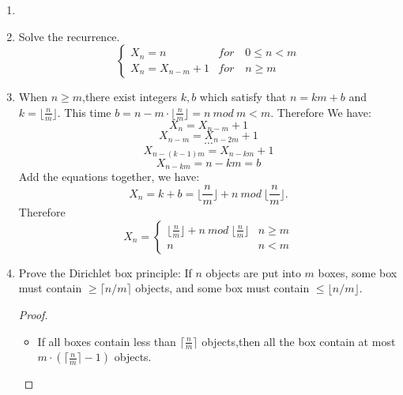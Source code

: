 \documentclass[12pt,a4paper]{article}
\makeatletter
\newtheorem*{solution}{Solution}
\theoremstyle{definition}
\renewenvironment{solution}[1][Solution] {\par\pushQED{\qed}\normalfont\topsep6\p@\@plus6\p@\relax\trivlist\item[\hskip\labelsep\bfseries#1\@addpunct{.}]\ignorespaces}{\popQED\endtrivlist\@endpefalse} \makeatother
\makeatother
\begin{document}
\begin{enumerate}
\begin{solution}
        \end{solution}
    \item
        Solve the recurrence.
        \begin{equation*}
            \begin{cases}
                X_n=n&for\quad 0\le n <m\\
                X_n=X_{n-m}+1&for\quad n\ge m
            \end{cases}
        \end{equation*}
        \begin{solution}
            When $n\ge m$,there exist integers $k,b$ which satisfy that $n=km+b$ and $k=\lfloor \frac{n}{m}\rfloor$.
            This time $b=n-m\cdot \lfloor \frac{n}{m} \rfloor=n\ mod\ m<m$.
            Therefore We have:
            \begin{equation*}
                     X_n=X_{n-m}+1
            \end{equation*}
            \begin{equation*}
                    X_{n-m}=X_{n-2m}+1
            \end{equation*}
            \begin{equation*}
                \cdots
            \end{equation*}
            \begin{equation*}
                X_{n-(k-1)m}=X_{n-km}+1
            \end{equation*}
            \begin{equation*}
               X_{n-km}=n-km=b
            \end{equation*}
            Add the equations together, we have:
            \begin{equation*}
                X_n=k+b=\lfloor \frac{n}{m} \rfloor+n\ mod\ \lfloor \frac{n}{m} \rfloor.
            \end{equation*}
            Therefore 
            \begin{equation*}
                X_n=
                \begin{cases}
                    \lfloor \frac{n}{m} \rfloor+n\ mod\ \lfloor \frac{n}{m} \rfloor&n\ge m\\
                    n&n<m  
                \end{cases}
            \end{equation*}
        \end{solution}
    \item 
        Prove the Dirichlet box principle: If $n$ objects are put into $m$ boxes, some box must contain $\ge \lceil n/m \rceil$ objects, and some box must contain $\le \lfloor n/m \rfloor$.
        \begin{proof}
            \ \\
            \begin{itemize}
            	\item 
            	    If all boxes contain less than $\lceil \frac{n}{m} \rceil$ objects,then all the box contain at most $m\cdot(\lceil \frac{n}{m} \rceil-1 )$ objects.
            	    

\end{itemize}
\end{proof}
\end{enumerate}
\end{document}
